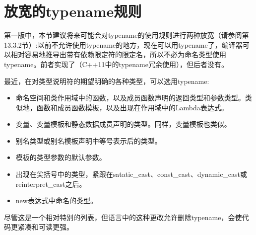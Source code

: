 \section{放宽的typename规则}

第一版中，本节建议将来可能会对typename的使用规则进行两种放宽（请参阅第13.3.2节）:以前不允许使用typename的地方，现在可以用typename了，编译器可以相对容易地推导出带有依赖限定符的限定名，所以不必为命名类型使用typename。前者实现了（C++11中的typename冗余使用），但后者没有。

最近，在对类型说明符的期望明确的各种类型，可以选用typename:

\begin{itemize}
\item 
命名空间和类作用域中的函数，以及成员函数声明的返回类型和参数类型。类似地，函数和成员函数模板，以及出现在作用域中的Lambda表达式。

\item 
变量、变量模板和静态数据成员声明的类型。同样，变量模板也类似。

\item 
别名类型或别名模板声明中等号表示后的类型。

\item 
模板的类型参数的默认参数。

\item 
出现在尖括号中的类型，紧跟在satatic\_cast、const\_cast、dynamic\_cast或reinterpret\_cast之后。

\item 
new表达式中命名的类型。
\end{itemize}

尽管这是一个相对特别的列表，但语言中的这种更改允许删除typename，会使代码更紧凑和可读更强。

